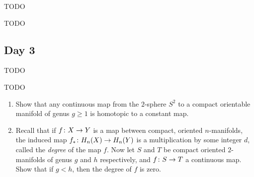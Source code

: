 
TODO


TODO

\subsection{Day 3}
\label{S:fall-2007-3}
\mbox{}


TODO


TODO


\begin{enumerate}
\item Show that any continuous map from the $2$-sphere $S^2$ to a compact orientable manifold of genus $g \geq 1$ is homotopic to a constant map.
\item Recall that if $f \colon X \rightarrow Y$ is a map between compact, oriented $n$-manifolds, the induced map $f_\ast \colon H_n(X) \rightarrow H_n(Y)$ is a multiplication by some integer $d$, called the \emph{degree} of the map $f$. Now let $S$ and $T$ be compact oriented $2$-manifolds of genus $g$ and $h$ respectively, and $f \colon S \rightarrow T$ a continuous map. Show that if $g < h$, then the degree of $f$ is zero.
\end{enumerate}

